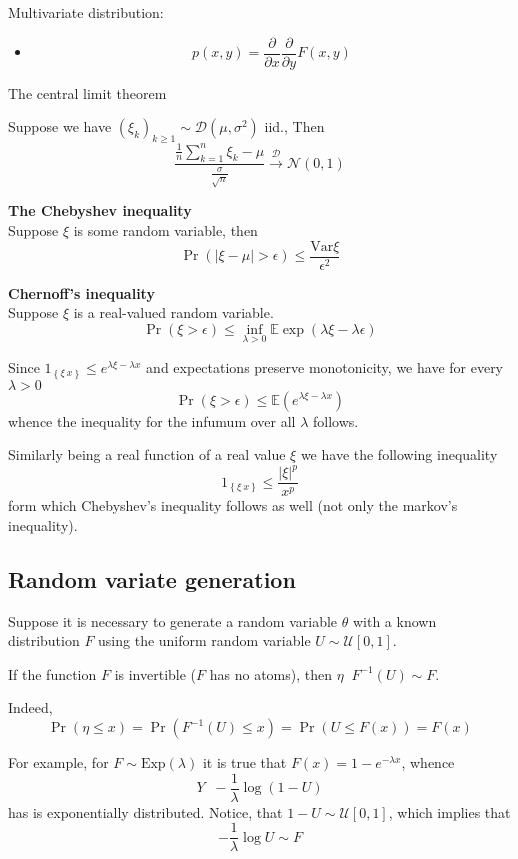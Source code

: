 \documentclass[a4paper]{article}
\newcommand{\obj}[1]{{\left\{ #1 \right \}}}
\newcommand{\clo}[1]{{\left [ #1 \right ]}}
\newcommand{\brac}[1]{{\left ( #1 \right )}}
\newcommand{\abs}[1]{{\left | #1 \right |}}
\newcommand{\ex}{\mathbb{E}}
\newcommand{\Var}{\text{Var}}
\newcommand{\defn}{\mathop{\overset{\Delta}{=}}\nolimits}
\begin{document}
Multivariate distribution:
\begin{itemize}
	\item \[p(x,y) = \frac{\partial}{\partial x}\frac{\partial}{\partial y} F(x,y)\]
\end{itemize}

The central limit theorem

Suppose we have $\brac{\xi_k}_{k\geq1}\sim \mathcal{D}(\mu, \sigma^2)$ iid., Then
\[\frac{\frac{1}{n}\sum_{k=1}^n \xi_k - \mu}{\frac{\sigma}{\sqrt{n}}} \overset{\mathcal{D}}{\to} \mathcal{N}(0,1)\]

\noindent\textbf{The Chebyshev inequality}\hfill\\
Suppose $\xi$ is some random variable, then 
\[\Pr\brac{\abs{\xi-\mu}> \epsilon}\leq \frac{\Var{\xi}}{\epsilon^2}\] 

\noindent\textbf{Chernoff's inequality}\hfill\\
Suppose $\xi$ is a real-valued random variable.
\[\Pr\brac{\xi>\epsilon}\leq \inf_{\lambda>0} \ex\exp\brac{\lambda\xi - \lambda\epsilon}\]

Since $1_\obj{\xi\>x}\leq e^{\lambda \xi - \lambda x}$ and expectations preserve monotonicity, we have for every $\lambda>0$
\[\Pr\brac{\xi>\epsilon}\leq \ex\brac{e^{\lambda \xi - \lambda x}}\]
whence the inequality for the infumum over all $\lambda$ follows.

Similarly being a real function of a real value $\xi$ we have the following inequality
\[1_\obj{\xi\>x}\leq \frac{\abs{\xi}^p}{x^p}\]
form which Chebyshev's inequality follows as well (not only the markov's inequality).

\subsection{Random variate generation} %
\label{sub:random_variate_generation}

Suppose it is necessary to generate a random variable $\theta$ with a known distribution $F$ using the uniform random variable $U\sim\mathcal{U}\clo{0,1}$.

If the function $F$ is invertible ($F$ has no atoms), then $\eta \defn F^{-1}(U)\sim F$.

Indeed, \[\Pr\brac{\eta\leq x} = \Pr\brac{F^{-1}(U)\leq x} = \Pr\brac{U\leq F(x)} = F(x)\]

For example, for $F\sim \text{Exp}(\lambda)$ it is true that $F(x)= 1-e^{-\lambda x}$, whence \[Y \defn -\frac{1}{\lambda}\log{(1-U)}\] has is exponentially distributed. Notice, that $1-U\sim\mathcal{U}\clo{0,1}$, which implies that \[-\frac{1}{\lambda}\log U \sim F\]
\end{document}
